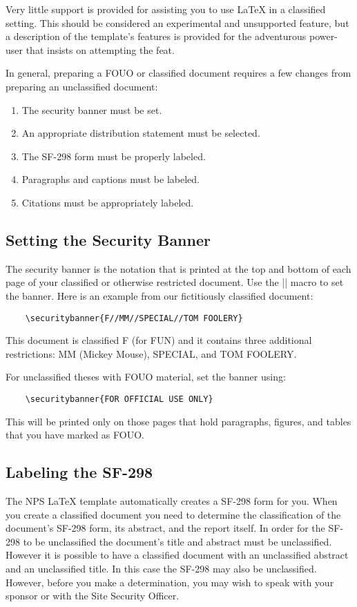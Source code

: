 Very little support is provided for assisting you to use \LaTeX{} in
a classified setting. This should be considered an experimental
and unsupported feature, but a description of the template's features is
provided for the adventurous power-user that insists
on attempting the feat.

In general, preparing a FOUO or classified document requires a few
changes from preparing an unclassified document:
\begin{enumerate}
\item The security banner must be set.
\item An appropriate distribution statement must be selected.
\item The SF-298 form must be properly labeled.
\item Paragraphs and captions must be labeled.
\item Citations must be appropriately labeled.
\end{enumerate}


\subsection{Setting the Security Banner}
The security banner is the notation that is printed at the top and
bottom of each page of your classified or otherwise restricted
document. Use the |\securitybanner{}| macro to set the banner. Here is
an example from our fictitiously classified document:

\begin{Verbatim}
    \securitybanner{F//MM//SPECIAL//TOM FOOLERY}
\end{Verbatim}

This document is classified F (for FUN) and it contains three
additional restrictions: MM (Mickey Mouse), SPECIAL, and TOM FOOLERY.

For unclassified theses with FOUO material, set the banner using:
\begin{Verbatim}
    \securitybanner{FOR OFFICIAL USE ONLY}
\end{Verbatim}
This will be printed only on those pages that hold 
paragraphs, figures, and tables that you have marked as FOUO.


\subsection{Labeling the SF-298}
The NPS \LaTeX{} template automatically creates a SF-298 form for
you. When you create a classified document you need to determine the
classification of the document's SF-298 form, its abstract, and the
report itself. In order for the SF-298 to be unclassified the
document's title and abstract must be unclassified. However it is
possible to have a classified document with an unclassified abstract
and an unclassified title. In this case the SF-298 may also be
unclassified. However, before you make a determination, you may wish
to speak with your sponsor or with the Site Security Officer. 

